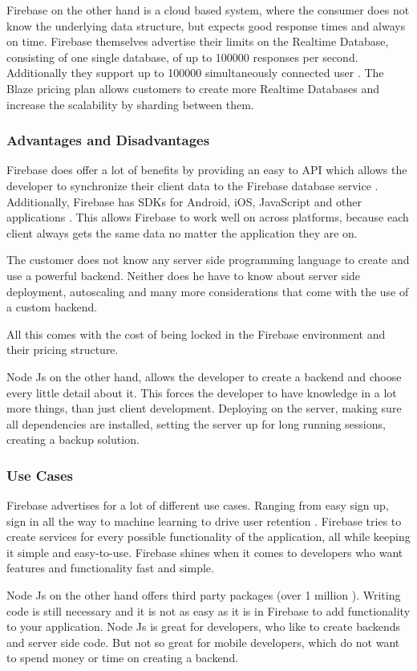 Firebase on the other hand is a cloud based system, where the consumer does not know the underlying data structure, but expects good response times and always on time. Firebase themselves advertise their limits on the Realtime Database, consisting of one single database, of up to 100000 responses per second. Additionally they support up to 100000 simultaneously connected user \cite{FirebaseDoc}. The Blaze pricing plan allows customers to create more Realtime Databases and increase the scalability by sharding between them.

\subsubsection{Advantages and Disadvantages}

Firebase does offer a lot of benefits by providing an easy to API which allows the developer to synchronize their client data to the Firebase database service \cite{khawas2018application}. Additionally, Firebase has SDKs for Android, iOS, JavaScript and other applications \cite{FirebaseDoc}. This allows Firebase to work well on across platforms, because each client always gets the same data no matter the application they are on. 

The customer does not know any server side programming language to create and use a powerful backend. Neither does he have to know about server side deployment, autoscaling and many more considerations that come with the use of a custom backend.

All this comes with the cost of being locked in the Firebase environment and their pricing structure.

Node Js on the other hand, allows the developer to create a backend and choose every little detail about it. This forces the developer to have knowledge in a lot more things, than just client development. Deploying on the server, making sure all dependencies are installed, setting the server up for long running sessions, creating a backup solution.

\subsubsection{Use Cases}

Firebase advertises for a lot of different use cases. Ranging from easy sign up, sign in all the way to machine learning to drive user retention \cite{FirebaseUsecases}. Firebase tries to create services for every possible functionality of the application, all while keeping it simple and easy-to-use. Firebase shines when it comes to developers who want features and functionality fast and simple.

Node Js on the other hand offers third party packages (over 1 million \cite{ModuleCounts}). Writing code is still necessary and it is not as easy as it is in Firebase to add functionality to your application. Node Js is great for developers, who like to create backends and server side code. But not so great for mobile developers, which do not want to spend money or time on creating a backend. 

